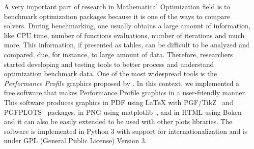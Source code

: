 A very important part of research in Mathematical Optimization field is to benchmark
optimization packages because it is one of the ways to compare
solvers.
During benchmarking, one usually
obtains a large amount of information, like CPU time, number of functions
evaluations, number of iterations and much more. This information, if
presented as tables, can be difficult to be analyzed and compared, due, for instance, to
large amount of data.  Therefore, researchers started developing and testing
tools to better process and understand optimization benchmark data. One of
the most widespread tools  is the \emph{Performance Profile} graphics proposed by
\textcite{Dolan:2002du}. In this context, we implemented a free software
that makes Performance Profile graphics in a user-friendly manner. This software produces graphics in PDF using LaTeX with
PGF/TikZ~\cite{TikZ} and PGFPLOTS~\cite{pgfplots} packages, in
PNG using matplotlib~\cite{Hunter:2007}, and in HTML using
Boken~\cite{url:bokeh} and it can also be easily
extended to be used with other plots libraries. The software is implemented
in Python 3 with support for internationalization and is under GPL (General
Public License) Version 3.
